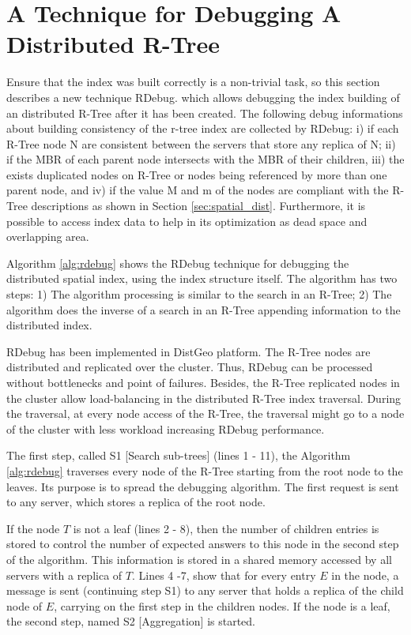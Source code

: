 \section{A Technique for Debugging A Distributed R-Tree}
\label{sec:rdebug}

Ensure that the index was built correctly is a non-trivial task, so this section describes a new technique RDebug.
which allows debugging the index building of an distributed R-Tree after it has been created. 
The following debug informations about building consistency of the r-tree index are collected by RDebug: 
i) if each R-Tree node N are consistent between the servers that store any replica of N;
ii) if the MBR of each parent node intersects with the MBR of their children, 
iii) the exists duplicated nodes on R-Tree or nodes being referenced by more than one parent node, and 
iv) if the value M and m of the nodes are compliant with the R-Tree descriptions as shown in Section \ref{sec:spatial_dist}. 
Furthermore, it is possible to access index data to help in its optimization as dead space and overlapping area.

Algorithm \ref{alg:rdebug} shows the RDebug technique for debugging the distributed spatial index, using the index structure itself. The algorithm has two steps:
1) The algorithm processing is similar to the search in an R-Tree; 2) The algorithm does the inverse of a search in an R-Tree appending information to the distributed index.

RDebug has been implemented in DistGeo platform. The R-Tree nodes are distributed and replicated over the cluster. Thus, RDebug can be processed without bottlenecks and point of failures. 
Besides, the R-Tree replicated nodes in the cluster allow load-balancing in the distributed R-Tree index traversal. 
During the traversal, at every node access of the R-Tree, the traversal might go to a node of the cluster with less workload increasing RDebug performance. 

The first step, called S1 [Search sub-trees] (lines 1 - 11), the Algorithm \ref{alg:rdebug} traverses every node of the R-Tree starting from the root node to the leaves. Its purpose is to spread the debugging algorithm. 
The first request is sent to any server, which stores a replica of the root node.

If the node $T$ is not a leaf (lines 2 - 8), then the number of children entries is stored to control the number of expected answers to this node in the second step of the algorithm. 
This information is stored in a shared memory accessed by all servers with a replica of $T$. Lines 4 -7, show that for every entry $E$ in the node, 
a message is sent (continuing step S1) to any server that holds a replica of the child node of $E$, carrying on the first step in the children nodes. 
If the node is a leaf, the second step, named S2 [Aggregation] is started.

